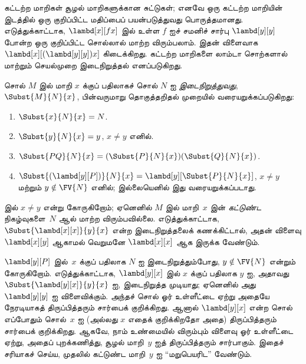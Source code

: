\documentclass[../../../include/open-logic-section]{subfiles}
\begin{document}

\begin{explain}
கட்டற்ற மாறிகள் சூழல் மாறிகளுக்கான சுட்டுகள்; எனவே ஒரு கட்டற்ற மாறியின்
இடத்தில் ஒரு குறிப்பிட்ட மதிப்பைப் பயன்படுத்துவது பொருத்தமானது. எடுத்துக்காட்டாக,
$\lambd[x][f x]$ இல் உள்ள $f$ ஐச் சமனிச் சார்பு $\lambd[y][y]$ போன்ற ஒரு
குறிப்பிட்ட சொல்லால் மாற்ற விரும்பலாம். இதன் விளைவாக
$\lambd[x][(\lambd[y][y]) x]$ கிடைக்கிறது. கட்டற்ற மாறிகளை லாம்டா சொற்களால்
மாற்றும் செயல்முறை இடைநிறுத்தல் எனப்படுகிறது.
\end{explain}

\begin{defn}[இடைநிறுத்தல்] 
  சொல் $M$ இல் மாறி $x$ க்குப் பதிலாகச் சொல் $N$ ஐ
  \emph{இடைநிறுத்துவது}, $\Subst{M}{N}{x}$, பின்வருமாறு தொகுத்தறிதல்
  முறையில் வரையறுக்கப்படுகிறது:
  \begin{enumerate}
    \item $\Subst{x}{N}{x} = N$. 
    \item $\Subst{y}{N}{x}  = y$, $x \neq y$ எனில். 
    \item $\Subst{PQ}{N}{x}  = (\Subst{P}{N}{x}) (\Subst{Q}{N}{x})$.
    \item $\Subst{(\lambd[y][P])}{N}{x} = \lambd[y][\Subst{P}{N}{x}]$,
      $x \neq y$ மற்றும் $y \notin \FV{N}$ எனில்; இல்லையெனில் இது
      வரையறுக்கப்படாது.
  \end{enumerate}
\end{defn}

\begin{explain}
 இல் $x \neq y$ என்று
கோருகிறோம்; ஏனெனில் $M$ இல் மாறி~$x$ இன் \emph{கட்டுண்ட} நிகழ்வுகளை~$N$
ஆல் மாற்ற விரும்பவில்லை. எடுத்துக்காட்டாக,
$\Subst{\lambd[x][x]}{y}{x}$ என்ற இடைநிறுத்தலைக் கணக்கிட்டால், அதன் விளைவு
$\lambd[x][y]$ ஆகாமல் வெறுமனே $\lambd[x][x]$ ஆக இருக்க வேண்டும்.

$\lambd[y][P]$ இல்~$x$ க்குப் பதிலாக $N$ ஐ இடைநிறுத்தும்போது,
$y \notin \FV{N}$ என்றும் கோருகிறோம். எடுத்துக்காட்டாக,
$\lambd[y][x]$ இல் $x$ க்குப் பதிலாக $y$ ஐ, அதாவது
$\Subst{\lambd[y][x]}{y}{x}$ ஐ, இடைநிறுத்த முடியாது; ஏனெனில் அது
$\lambd[y][y]$ ஐ விளைவிக்கும். அந்தச் சொல் ஓர் உள்ளீட்டை ஏற்று அதையே நேரடியாகத்
திருப்பித்தரும் சார்பைக் குறிக்கிறது. ஆனால் $\lambd[y][x]$ என்ற சொல் எப்போதும்
சொல்~$x$ ஐ (அல்லது $x$ எதைக் குறிக்கிறதோ அதை) திருப்பித்தரும் சார்பைக்
குறிக்கிறது. ஆகவே, நாம் உண்மையில் விரும்பும் விளைவு ஓர் உள்ளீட்டை ஏற்று,
அதைப் புறக்கணித்து, சூழல் மாறி~$y$ ஐத் திருப்பித்தரும் சார்பாகும். இதைச்
சரியாகச் செய்ய, முதலில் கட்டுண்ட மாறி~$y$ ஐ ``மறுபெயரிட'' வேண்டும்.
\end{explain}
\end{document}
